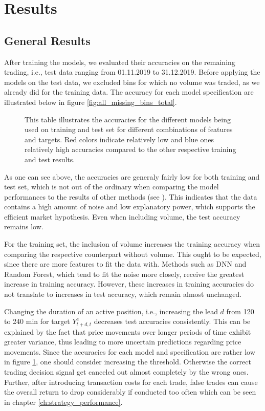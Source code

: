 \section{Results}

\subsection{General Results}

After training the models, we evaluated their accuracies on the remaining trading, i.e., test data ranging from 01.11.2019 to 31.12.2019.
Before applying the models on the test data, we excluded bins for which no volume was traded, as we already did for the training data.
The accuracy for each model specification are illustrated below in figure \ref{fig:all_missing_bins_total}.

\begin{figure}[H]
    \captionsetup{format=plain}
    \caption{ 
        This table illustrates the accuracies for the different models being used on training
        and test set for different combinations of features and targets. 
        Red colors indicate relatively low and blue ones relatively high accuracies compared to the other respective training and test results.
    }
    \label{fig:all_accuracy_train_test}
\end{figure}


As one can see above, the accuracies are generaly fairly low for both training and test set,
which is not out of the ordinary when comparing the model performances to the results of other methods (see \cite{mcnally2018predictBTC}).
This indicates that the data contains a high amount of noise and low explanatory power, 
which supports the efficient market hypothesis. Even when including volume, the test accuracy remains low.

For the training set, the inclusion of volume increases the training accuracy when comparing the respective counterpart without volume.
This ought to be expected, since there are more features to fit the data with.
Methods such as DNN and Random Forest, which tend to fit the noise more closely, 
receive the greatest increase in training accuracy.
However, these increases in training accuracies do not translate to increases in test accuracy, which remain almost unchanged.

Changing the duration of an active position, i.e., increasing the lead $d$ from 120 to 240 min for target $ Y^{c}_{t + d, t} $ decreases test accuracies consistently.
This can be explained by the fact that price movements over longer periods of time exhibit greater variance,
thus leading to more uncertain predictions regarding price movements.
Since the accuracies for each model and specification are rather low in figure \ref{fig:all_accuracy_train_test}, 
one should consider increasing the threshold. Otherwise the correct trading decision signal get canceled out almost completely by the wrong ones.
Further, after introducing transaction costs for each trade, false trades can cause the overall return to drop considerably if conducted too often
which can be seen in chapter \ref{ch:strategy_performance}.


